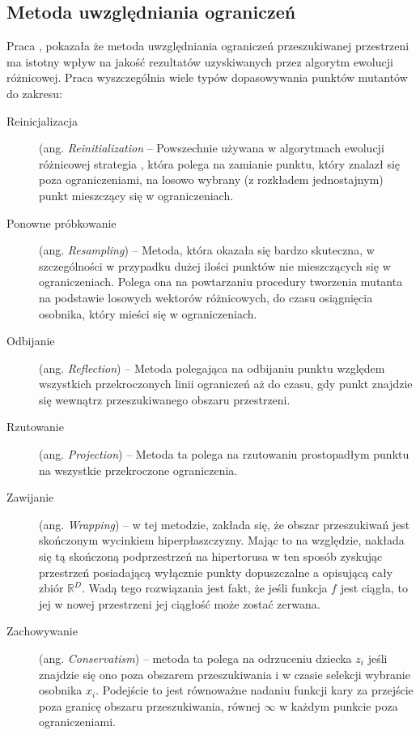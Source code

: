 \documentclass[12pt,a4paper]{report}
\begin{document}
{{{\subsection{Metoda uwzględniania ograniczeń}
\par{
Praca \cite{Boundary}, pokazała że metoda uwzględniania ograniczeń przeszukiwanej przestrzeni ma istotny wpływ na jakość rezultatów uzyskiwanych przez algorytm ewolucji różnicowej. Praca wyszczególnia wiele typów dopasowywania punktów mutantów do zakresu:
\begin{description}
\item[Reinicjalizacja] (ang. \emph{Reinitialization} -- Powszechnie używana w algorytmach ewolucji różnicowej strategia \cite{Boundary}, która polega na zamianie punktu, który znalazł się poza ograniczeniami, na losowo wybrany (z rozkładem jednostajnym) punkt mieszczący się w ograniczeniach.
\item[Ponowne próbkowanie] (ang. \emph{Resampling}) -- Metoda, która okazała się bardzo skuteczna, w szczególności w przypadku dużej ilości punktów nie mieszczących się w ograniczeniach. Polega ona na powtarzaniu procedury tworzenia mutanta na podstawie losowych wektorów różnicowych, do czasu osiągnięcia osobnika, który mieści się w ograniczeniach.
\item[Odbijanie] (ang. \emph{Reflection}) -- Metoda polegająca na odbijaniu punktu względem wszystkich przekroczonych linii ograniczeń aż do czasu, gdy punkt znajdzie się wewnątrz przeszukiwanego obszaru przestrzeni.
\item[Rzutowanie] (ang. \emph{Projection}) -- Metoda ta polega na rzutowaniu prostopadłym punktu na wszystkie przekroczone ograniczenia.
\item[Zawijanie] (ang. \emph{Wrapping}) -- w tej metodzie, zakłada się, że obszar przeszukiwań jest skończonym wycinkiem hiperpłaszczyzny. Mając to na względzie, nakłada się tą skończoną podprzestrzeń na hipertorusa w ten sposób zyskując przestrzeń posiadającą wyłącznie punkty dopuszczalne a opisującą cały zbiór $\mathbb{R}^D$. Wadą tego rozwiązania jest fakt, że jeśli funkcja $f$ jest ciągła, to jej w nowej przestrzeni jej ciągłość może zostać zerwana.
\item[Zachowywanie] (ang. \emph{Conservatism}) -- metoda ta polega na odrzuceniu dziecka $z_i$ jeśli znajdzie się ono poza obszarem przeszukiwania i w czasie selekcji wybranie osobnika $x_i$. Podejście to jest równoważne nadaniu funkcji kary za przejście poza granicę obszaru przeszukiwania, równej $\infty$ w każdym punkcie poza ograniczeniami.

\end{description}}}}}
\end{document}
